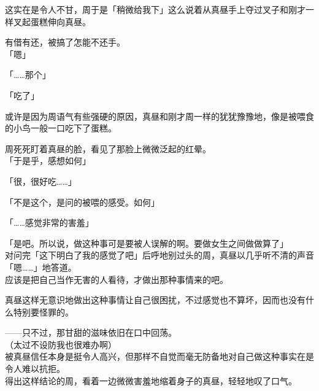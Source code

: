 这实在是令人不甘，周于是「稍微给我下」这么说着从真昼手上夺过叉子和刚才一样叉起蛋糕伸向真昼。

有借有还，被搞了怎能不还手。\\

「嗯」

「……那个」

「吃了」

或许是因为周语气有些强硬的原因，真昼和刚才周一样的犹犹豫豫地，像是被喂食的小鸟一般一口吃下了蛋糕。

周死死盯着真昼的脸，看见了那脸上微微泛起的红晕。\\

「于是乎，感想如何」

「很，很好吃……」

「不是这个，是问的被喂的感受。如何」

「……感觉非常的害羞」

「是吧。所以说，做这种事可是要被人误解的啊。要做女生之间做做算了」\\

对问完「这下明白了我的感觉了吧」后呼地别过头的周，真昼以几乎听不清的声音「嗯……」地答道。\\

应该是把自己当作无害的人看待，才做出那种事情来的吧。

真昼这样无意识地做出这种事情让自己很困扰，不过感觉也不算坏，因而也没有什么特别要怪罪的。

——只不过，那甘甜的滋味依旧在口中回荡。\\

（太过不设防我也很难办啊）\\

被真昼信任本身是挺令人高兴，但那样不自觉而毫无防备地对自己做这种事实在是令人难以抗拒。\\

得出这样结论的周，看着一边微微害羞地缩着身子的真昼，轻轻地叹了口气。\\